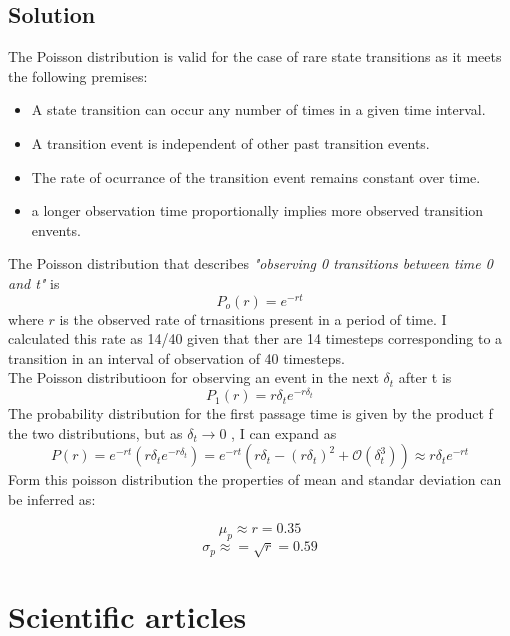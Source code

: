 \documentclass{article}
\begin{document}
\subsection*{Solution}
The Poisson distribution is valid for the case of rare state transitions as it meets the following premises:
\begin{itemize}
    \item A state transition can occur any number of times in a given time interval.
    \item A transition event is independent of other past transition events.
    \item The rate of ocurrance of the transition event remains constant over time.
    \item a longer observation time proportionally implies more observed transition envents.
\end{itemize}
The Poisson distribution that describes \textit{"observing 0 transitions between time 0 and t"} is
\begin{equation}
    P_o(r) = e^{-rt}
\end{equation}
where $r$ is the observed rate of trnasitions present in a period of time. I calculated this rate as 14/40 given that ther are 14 timesteps corresponding to a transition in an interval of observation of 40 timesteps.\\
The Poisson distributioon for observing an event in the next $\delta_t$ after t is
\begin{equation}
    P_1(r) = r\delta_t e^{-r\delta_t}
\end{equation}
The probability distribution for the first passage time is given by the product f the two distributions, but
as $\delta_t \to 0$ , I can expand as
\begin{equation}
    P(r) =e^{-rt} \left(r\delta_t e^{-r\delta_t}\right)  = e^{-rt} \left(r\delta_t - \left(r\delta_t \right)^2 + \mathcal{O}(\delta_t^3)\right) \approx r\delta_t e^{-rt}
\end{equation}
Form this poisson distribution the properties of mean and standar deviation can be inferred as:

\begin{equation}
    \mu_p \approx r = 0.35
\end{equation}
\begin{equation*}
 \sigma_p \approx = \sqrt{r} = 0.59
\end{equation*}

\newpage

\section{Scientific articles}
\end{document}
